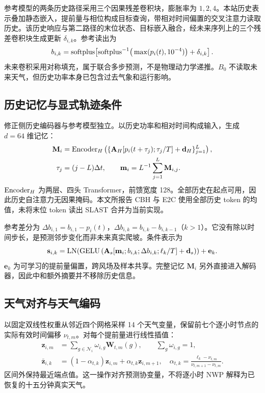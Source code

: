 参考模型的两条历史路径采用三个因果残差卷积块，膨胀率为 $1,2,4$。本站历史表示叠加静态嵌入，提前量与相位构成目标查询，带相对时间偏置的交叉注意力读取历史。该历史响应与第二路径的末位状态、目标嵌入融合，经未来序列上的三个残差卷积块生成更新 $\delta_{i,k}$。参考读出为
\begin{equation}
 b_{i,k}=\operatorname{softplus}\!\left[\operatorname{softplus}^{-1}\!\big(\max(p_i(t),10^{-4})\big)+\delta_{i,k}\right].
\end{equation}
未来卷积采用对称填充，属于联合多步预测，不是物理动力学递推。$B_0$ 不读取未来天气，但历史功率本身已包含过去气象和运行影响。

\subsection{历史记忆与显式轨迹条件}
修正侧历史编码器与参考模型独立。以历史功率和相对时间构成输入，生成 $d=64$ 维记忆：
\begin{align}
 \mathbf M_i&=\operatorname{Encoder}_H\left(\{\mathbf A_H[p_i(t+\tau_j);\tau_j/T]+\mathbf d_H\}_{j=1}^{L}\right),\\
 \tau_j&=(j-L)\Delta t,\qquad
 \mathbf m_i=L^{-1}\sum_{j=1}^{L}\mathbf M_{i,j}.
 \label{eq:summary}
\end{align}
$\operatorname{Encoder}_H$ 为两层、四头 Transformer，前馈宽度 128。全部历史在起点可用，因此历史自注意力无因果掩码。本文所报告 CBH 与 E2C 使用全部历史 token 的均值，未将末位 token 读出 SLAST 合并为当前实现。

参考差分为 $\Delta b_{i,1}=b_{i,1}-p_i(t)$，$\Delta b_{i,k}=b_{i,k}-b_{i,k-1}$（$k>1$）。它没有除以时间步长，是预测邻步变化而非未来真实爬坡。条件表示为
\begin{equation}
 \mathbf s_{i,k}=\operatorname{LN}\!\left(\operatorname{GELU}\left(\mathbf A_s[\mathbf m_i;b_{i,k};\Delta b_{i,k};\ell_k/T]+\mathbf d_s\right)\right)+\mathbf e_k.
 \label{eq:condition}
\end{equation}
$\mathbf e_k$ 为可学习的提前量偏置，跨风场及样本共享。完整记忆 $\mathbf M_i$ 另外直接进入解码器，因此中和额外摘要并不移除历史信息。

\subsection{天气对齐与天气编码}
以固定双线性权重从邻近四个网格采样 14 个天气变量，保留前七个逐小时节点的实际有效时间偏移 $\nu_{t,m}$。对每个提前量进行线性插值：
\begin{align}
 \mathbf z_{i,m}&=\sum_{g\in\mathcal N_i}\omega_{i,g}\mathbf W_{t,m}(g),\qquad \sum_g\omega_{i,g}=1,\\
 \bar{\mathbf z}_{i,k}&=(1-\alpha_{t,k})\mathbf z_{i,m}+\alpha_{t,k}\mathbf z_{i,m+1},\quad
 \alpha_{t,k}=\frac{\ell_k-\nu_{t,m}}{\nu_{t,m+1}-\nu_{t,m}}.
\end{align}
区间外保持最近端点值。这一操作对齐预测协变量，不将逐小时 NWP 解释为已恢复的十五分钟真实天气。

